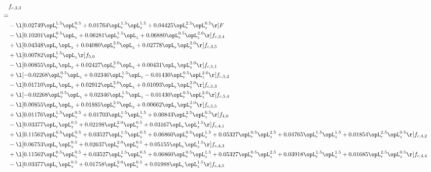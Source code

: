 \begin{alignat}{2} 
\label{eq:f_33_2} 
& f_{c,3,3} \nonumber \\ 
 = \\ 
& - \l[  0.02749 \opL_r^{1.5} \opL_z^{0.5} +  0.01764 \opL_r^{1.5} \opL_z^{1.5} +  0.04425 \opL_r^{2.5} \opL_z^{0.5}  \r] F \nonumber \\ 
& - \l[  0.10201 \opL_r^{0.5} \opL_z +  0.06281 \opL_r^{1.5} \opL_z +  0.06880 \opL_r^{0.5} \opL_z^{2.0}  \r] f_{c,3,4} \nonumber \\ 
& + \l[  0.04348 \opL_r \opL_z +  0.04080 \opL_r^{2.0} \opL_z +  0.02778 \opL_r \opL_z^{2.0}  \r] f_{c,3,5} \nonumber \\ 
& + \l[  0.00782 \opL_r^{1.5} \opL_z  \r] f_{5,0} \nonumber \\ 
& - \l[  0.00855 \opL_r \opL_z +  0.02427 \opL_r^{2.0} \opL_z +  0.00431 \opL_r \opL_z^{2.0}  \r] f_{c,5,1} \nonumber \\ 
& + \l[  -0.02268 \opL_r^{0.5} \opL_z +  0.02346 \opL_r^{1.5} \opL_z   -0.01430 \opL_r^{0.5} \opL_z^{2.0}  \r] f_{c,5,2} \nonumber \\ 
& - \l[  0.01710 \opL_r \opL_z +  0.02912 \opL_r^{2.0} \opL_z +  0.01093 \opL_r \opL_z^{2.0}  \r] f_{c,5,3} \nonumber \\ 
& + \l[  -0.02268 \opL_r^{0.5} \opL_z +  0.02346 \opL_r^{1.5} \opL_z   -0.01430 \opL_r^{0.5} \opL_z^{2.0}  \r] f_{c,5,4} \nonumber \\ 
& - \l[  0.00855 \opL_r \opL_z +  0.01885 \opL_r^{2.0} \opL_z +  0.00662 \opL_r \opL_z^{2.0}  \r] f_{c,5,5} \nonumber \\ 
& + \l[  0.01176 \opL_r^{1.5} \opL_z^{0.5} +  0.01703 \opL_r^{1.5} \opL_z^{1.5} +  0.00843 \opL_r^{2.5} \opL_z^{0.5}  \r] f_{4,0} \nonumber \\ 
& - \l[  0.03377 \opL_r \opL_z^{0.5} +  0.02198 \opL_r^{2.0} \opL_z^{0.5} +  0.03167 \opL_r \opL_z^{1.5}  \r] f_{c,4,1} \nonumber \\ 
& + \l[  0.11562 \opL_r^{0.5} \opL_z^{0.5} +  0.03527 \opL_r^{1.5} \opL_z^{0.5} +  0.06860 \opL_r^{0.5} \opL_z^{1.5} +  0.05327 \opL_r^{0.5} \opL_z^{2.5} +  0.04765 \opL_r^{1.5} \opL_z^{1.5} +  0.01854 \opL_r^{2.5} \opL_z^{0.5}  \r] f_{c,4,2} \nonumber \\ 
& - \l[  0.06753 \opL_r \opL_z^{0.5} +  0.02637 \opL_r^{2.0} \opL_z^{0.5} +  0.05155 \opL_r \opL_z^{1.5}  \r] f_{c,4,3} \nonumber \\ 
& + \l[  0.11562 \opL_r^{0.5} \opL_z^{0.5} +  0.03527 \opL_r^{1.5} \opL_z^{0.5} +  0.06860 \opL_r^{0.5} \opL_z^{1.5} +  0.05327 \opL_r^{0.5} \opL_z^{2.5} +  0.03918 \opL_r^{1.5} \opL_z^{1.5} +  0.01685 \opL_r^{2.5} \opL_z^{0.5}  \r] f_{c,4,4} \nonumber \\ 
& - \l[  0.03377 \opL_r \opL_z^{0.5} +  0.01758 \opL_r^{2.0} \opL_z^{0.5} +  0.01988 \opL_r \opL_z^{1.5}  \r] f_{c,4,5} \nonumber \\ 
\end{alignat} 


